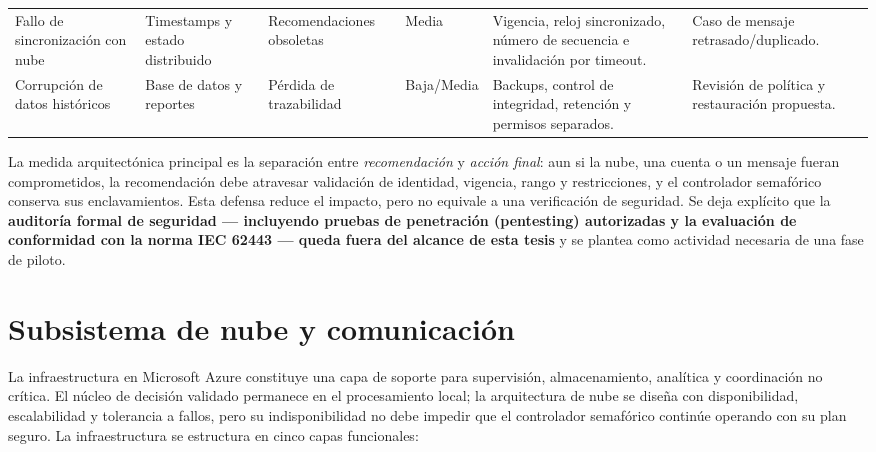 \begin{landscape}
\begin{table}[H]
\begin{tabular}{@{}p{3.6cm}p{3.0cm}p{3.0cm}p{1.8cm}p{5.4cm}p{3.6cm}@{}}
Fallo de sincronización con nube & Timestamps y estado distribuido & Recomendaciones obsoletas & Media & Vigencia, reloj sincronizado, número de secuencia e invalidación por timeout. & Caso de mensaje retrasado/duplicado.\\
Corrupción de datos históricos & Base de datos y reportes & Pérdida de trazabilidad & Baja/Media & Backups, control de integridad, retención y permisos separados. & Revisión de política y restauración propuesta.\\
\bottomrule
  \end{tabular}
\end{table}
\end{landscape}

La medida arquitectónica principal es la separación entre \emph{recomendación} y \emph{acción
final}: aun si la nube, una cuenta o un mensaje fueran comprometidos, la recomendación debe
atravesar validación de identidad, vigencia, rango y restricciones, y el controlador semafórico
conserva sus enclavamientos. Esta defensa reduce el impacto, pero no equivale a una
verificación de seguridad. Se deja explícito que la \textbf{auditoría formal de seguridad ---
incluyendo pruebas de penetración (pentesting) autorizadas y la evaluación de conformidad con la
norma IEC 62443 --- queda fuera del alcance de esta tesis} y se plantea como actividad necesaria
de una fase de piloto.

\section{Subsistema de nube y comunicación}\label{sec:nube}

La infraestructura en Microsoft Azure constituye una capa de soporte para supervisión,
almacenamiento, analítica y coordinación no crítica. El núcleo de decisión validado permanece en
el procesamiento local; la arquitectura de nube se diseña con disponibilidad, escalabilidad y
tolerancia a fallos, pero su indisponibilidad no debe impedir que el controlador semafórico
continúe operando con su plan seguro. La infraestructura se estructura en cinco capas
funcionales:

